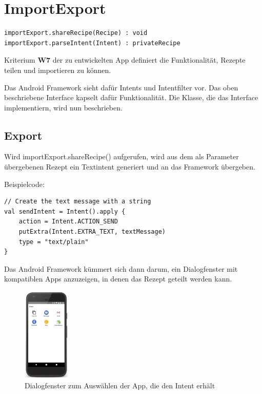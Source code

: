 \section{ImportExport}

\begin{lstlisting}
importExport.shareRecipe(Recipe) : void
importExport.parseIntent(Intent) : privateRecipe
\end{lstlisting}

Kriterium \textbf{W7} der zu entwickelten App definiert die Funktionalität, Rezepte teilen und importieren zu können. 

Das Android Framework sieht dafür Intents und  Intentfilter vor. 
Das oben beschriebene Interface kapselt dafür Funktionalität. 
Die Klasse, die das Interface implementiern, wird nun beschrieben.

\subsection{Export}
Wird importExport.shareRecipe() aufgerufen, wird aus dem als Parameter übergebenen Rezept ein Textintent generiert und an das Framework übergeben. 

Beispielcode:

\begin{lstlisting}
// Create the text message with a string
val sendIntent = Intent().apply {
    action = Intent.ACTION_SEND
    putExtra(Intent.EXTRA_TEXT, textMessage)
    type = "text/plain"
}
\end{lstlisting}


Das Android Framework kümmert sich dann darum, ein Dialogfenster mit kompatiblen Apps anzuzeigen, in denen
das Rezept geteilt werden kann. 

\begin{figure}[H]
\centering
\includegraphics[width=0.2\textwidth]{pics/intentchoser.png}%
\caption{Dialogfenster zum Auswählen der App, die den Intent erhält \cite{AndroidArchitectureComponents}}%
\label{choseapp}%
\end{figure}

